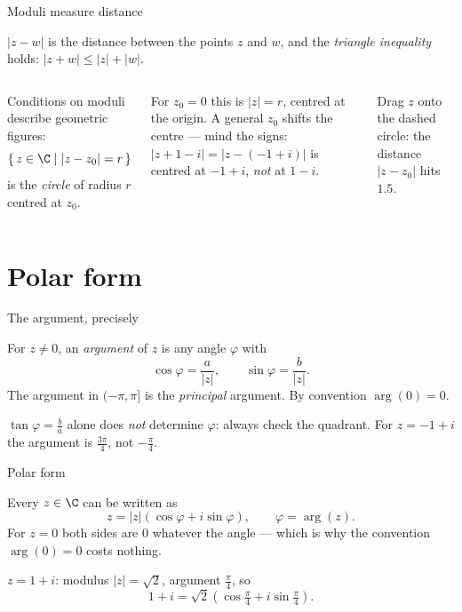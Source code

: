 \begin{frame}{Moduli measure distance}
\begin{fact}
$|z - w|$ is the distance between the points $z$ and $w$, and the
\emph{triangle inequality} holds: $|z+w| \leq |z| + |w|$.
\end{fact}

\pause

\begin{columns}
\column
Conditions on moduli describe geometric figures:
\[
\{\, z \in \C \mid |z - z_0| = r \,\}
\]
is the \emph{circle} of radius $r$ centred at $z_0$.

For $z_0 = 0$ this is $|z| = r$, centred at the origin. A general $z_0$
shifts the centre — mind the signs: $|z + 1 - i| = |z - (-1+i)|$ is centred
at $-1+i$, \emph{not} at $1-i$.

Drag $z$ onto the dashed circle: the distance $|z - z_0|$ hits $1.5$.
\column
{}
\end{columns}
\end{frame}

\section{Polar form}

\begin{frame}{The argument, precisely}
\begin{definition}
For $z \neq 0$, an \emph{argument} of $z$ is any angle $\varphi$ with
\[
\cos\varphi = \frac{a}{|z|}, \qquad \sin\varphi = \frac{b}{|z|}.
\]
The argument in $(-\pi, \pi]$ is the \emph{principal} argument.
By convention $\arg(0) = 0$.
\end{definition}

\pause

\begin{warning}
$\tan\varphi = \tfrac{b}{a}$ alone does \emph{not} determine $\varphi$: always
check the quadrant. For $z = -1 + i$ the argument is $\tfrac{3\pi}{4}$,
not $-\tfrac{\pi}{4}$.
\end{warning}
\end{frame}

\begin{frame}{Polar form}
\begin{theorem}
Every $z \in \C$ can be written as
\[
z = |z| \left( \cos\varphi + i \sin\varphi \right), \qquad \varphi = \arg(z).
\]
For $z = 0$ both sides are $0$ whatever the angle — which is why the
convention $\arg(0) = 0$ costs nothing.
\end{theorem}

\pause

\begin{example}
$z = 1 + i$: modulus $|z| = \sqrt2$, argument $\tfrac{\pi}{4}$, so
\[
1 + i = \sqrt2 \left( \cos\tfrac{\pi}{4} + i \sin\tfrac{\pi}{4} \right).
\]
\end{example}
\end{frame}


